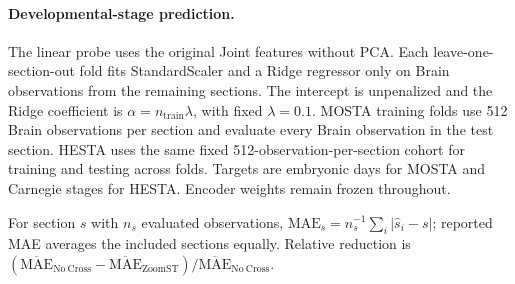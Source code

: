 \begin{table}[!htbp]
\centering\small
\caption{\textbf{Spot-level pseudotime--stage Spearman correlation within Brain.} Correlation is computed over all 4,712 observations spanning eight MOSTA stages. Bold marks the highest value.}
\label{tab:developmental-ordering}
\setlength{\tabcolsep}{10pt}
\renewcommand{\arraystretch}{1.05}

\end{table}

\paragraph{Developmental-stage prediction.}
The linear probe uses the original Joint features without PCA. Each leave-one-section-out fold fits StandardScaler and a Ridge regressor only on Brain observations from the remaining sections. The intercept is unpenalized and the Ridge coefficient is $\alpha=n_{\mathrm{train}}\lambda$, with fixed $\lambda=0.1$. MOSTA training folds use 512 Brain observations per section and evaluate every Brain observation in the test section. HESTA uses the same fixed 512-observation-per-section cohort for training and testing across folds. Targets are embryonic days for MOSTA and Carnegie stages for HESTA. Encoder weights remain frozen throughout.

For section $s$ with $n_s$ evaluated observations, $\mathrm{MAE}_s=n_s^{-1}\sum_i|\hat{s}_i-s|$; reported MAE averages the included sections equally. Relative reduction is $(\overline{\mathrm{MAE}}_{\mathrm{No\ Cross}}-\overline{\mathrm{MAE}}_{\mathrm{ZoomST}})/\overline{\mathrm{MAE}}_{\mathrm{No\ Cross}}$.
\FloatBarrier
